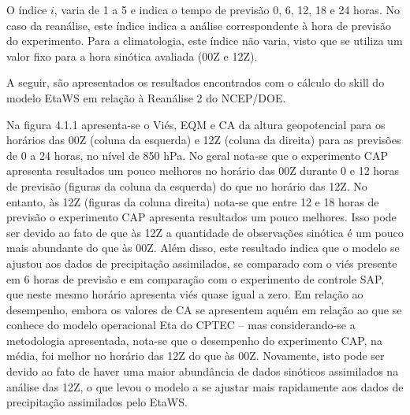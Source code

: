 O índice $i$, varia de 1 a 5 e indica o tempo de previsão 0, 6, 12, 18 e 24 horas. No caso da reanálise, este índice indica a análise correspondente à hora de previsão do experimento. Para a climatologia, este índice não varia, visto que se utiliza um valor fixo para a hora sinótica avaliada (00Z e 12Z).

A seguir, são apresentados os resultados encontrados com o cálculo do skill do modelo EtaWS em relação à Reanálise 2 do NCEP/DOE.

Na figura 4.1.1 apresenta-se o Viés, EQM e CA da altura geopotencial para os horários das 00Z (coluna da esquerda) e 12Z (coluna da direita) para as previsões de 0 a 24 horas, no nível de 850 hPa. No geral nota-se que o experimento CAP apresenta resultados um pouco melhores no horário das 00Z durante 0 e 12 horas de previsão (figuras da coluna da esquerda) do que no horário das 12Z. No entanto, às 12Z (figuras da coluna direita) nota-se que entre 12 e 18 horas de previsão o experimento CAP apresenta resultados um pouco melhores. Isso pode ser devido ao fato de que às 12Z a quantidade de observações sinótica é um pouco mais abundante do que às 00Z. Além disso, este resultado indica que o modelo se ajustou aos dados de precipitação assimilados, se comparado com o viés presente em 6 horas de previsão e em comparação com o experimento de controle SAP, que neste mesmo horário apresenta viés quase igual a zero. Em relação ao desempenho, embora os valores de CA se apresentem aquém em relação ao que se conhece do modelo operacional Eta do CPTEC – mas considerando-se a metodologia apresentada, nota-se que o desempenho do experimento CAP, na média, foi melhor no horário das 12Z do que às 00Z. Novamente, isto pode ser devido ao fato de haver uma maior abundância de dados sinóticos assimilados na análise das 12Z, o que levou o modelo a se ajustar mais rapidamente aos dados de precipitação assimilados pelo EtaWS.


